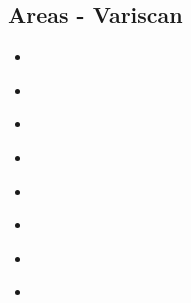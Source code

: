 \subsection{Areas - Variscan}

\begin{scriptsize}
\begin{itemize}
\item[\nineteenninetynine] 
\textcite{vajh99} \\
\item[\twothousandfour] 
\textcite{fijj04}  \\
\item[\twothousandseven] 
\textcite{masp07}  \\
\item[\twothousandthirteen] 
\textcite{rems13}  \\
\item[\twothousandseventeen] 
\textcite{regorda}  \\
\item[\twothousandeighteen] 
\textcite{gesr18}  \\
\item[\twothousandtwenty] 
\textcite{relr20} \\
\item[\twothousandtwentyone] 
\textcite{mass21} 
\end{itemize}
\end{scriptsize}




